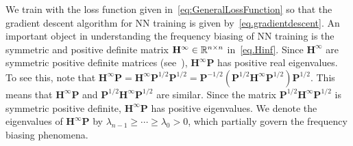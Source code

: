 We train with the loss function given in~\cref{eq:GeneralLossFunction} so that the gradient descent algorithm for NN training is given by~\cref{eq.gradientdescent}. An important object in understanding the frequency biasing of NN training is the symmetric and positive definite matrix $\mathbf{H}^\infty \in \mathbb{R}^{n \times n}$ in~\cref{eq.Hinf}. Since $\mathbf{H}^\infty$ are symmetric positive definite matrices (see~), $\mathbf{H}^\infty \mathbf{P}$ has positive real eigenvalues. To see this, note that $\mathbf{H}^\infty \mathbf P = \mathbf H^\infty \mathbf P^{1/2} \mathbf P^{1/2} = \mathbf P^{-1/2} (\mathbf P^{1/2} \mathbf H^\infty \mathbf P^{1/2}) \mathbf P^{1/2}$. This means that $\mathbf H^\infty \mathbf P$ and $\mathbf P^{1/2} \mathbf H^\infty \mathbf P^{1/2}$ are similar. Since the matrix $\mathbf P^{1/2} \mathbf H^\infty \mathbf P^{1/2}$ is symmetric positive definite, $\mathbf H^\infty \mathbf P$ has positive eigenvalues. We denote the eigenvalues of $\mathbf H^\infty \mathbf P$ by $\lambda_{n-1} \geq \cdots \geq \lambda_0 > 0$, which partially govern the frequency biasing phenomena. 

